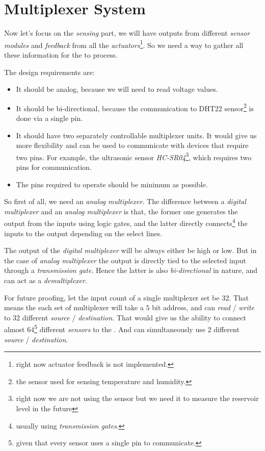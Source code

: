 \documentclass[../../main]{subfiles}
\begin{document}
\section{Multiplexer System} \label{sec:}

Now let's focus on the \emph{sensing} part, we will have outputs from different
\emph{sensor modules} and \emph{feedback} from all the \emph{actuators}\footnote{right now
actuator feedback is not implemented.}. So we need a way to gather all these information
for the \esp to process.

The design requirements are:

\begin{itemize}
    \item It should be analog, because we will need to read voltage values.
    \item It should be bi-directional, because the communication to DHT22 sensor\footnote{the
        sensor used for sensing temperature and humidity.} is done via a single pin.
    \item It should have two separately controllable multiplexer units. It would give us
        more flexibility and can be used to communicate with devices that require two
        pins. For example, the ultrasonic sensor \emph{HC-SR04}\footnote{right now we are
        not using the sensor but we need it to measure the reservoir level in the future},
        which requires two pins for communication.
    \item The pins required to operate should be minimum as possible.
\end{itemize}

So first of all, we need an \emph{analog multiplexer}. The difference between a \emph{digital
multiplexer} and an \emph{analog multiplexer} is that, the former one generates the output
from the inputs using logic gates, and the latter directly connects\footnote{usually using
\emph{transmission gates}.} the inputs to the output depending on the select lines.

The output of the \emph{digital multiplexer} will be always either be high or low. But in
the case of \emph{analog multiplexer} the output is directly tied to the selected input
through a \emph{transmission gate}. Hence the latter is also \emph{bi-directional} in nature,
and can act as a \emph{demultiplexer}.


For future proofing, let the input count of a single multiplexer set be $32$. That means the
each set of multiplexer will take a $5$ bit address, and can \emph{read} / \emph{write} to
$32$ different \emph{source} / \emph{destination}. That would give us the ability to connect
almost $64$\footnote{given that every sensor uses a single pin to communicate.} different
\emph{sensors} to the \esp. And can simultaneously use $2$ different \emph{source} / \emph{destination}.
\end{document}
